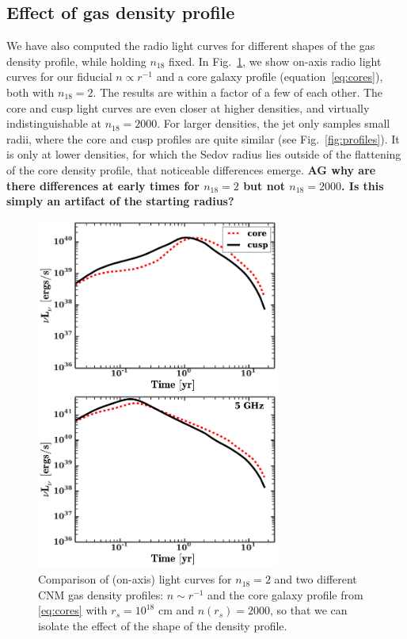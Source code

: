 \documentclass[usenatbib,fleqn]{mnras}
\begin{document}


\subsection{Effect of gas density profile}
\label{sec:profileComp}
We have also computed the radio light curves for different shapes of
the gas density profile, while holding $n_{18}$ fixed. In
Fig.~\ref{fig:cores}, we show on-axis radio light curves for our
fiducial $n\propto r^{-1}$ and a core galaxy profile
(equation~\eqref{eq:cores}), both with $n_{18}=2$.
The results are within a factor of a few of each other. The core and
cusp light curves are even closer at higher densities, and virtually
indistinguishable at $n_{18}=2000$. For larger densities, the jet only
samples small radii, where the core and cusp profiles are quite
similar (see Fig.~\ref{fig:profiles}). It is only at lower densities,
for which the Sedov radius lies outside of the flattening of the core
density profile, that noticeable differences emerge. {\bf AG why are
  there differences at early times for $n_{18}=2$ but not
  $n_{18}=2000$. Is this simply an artifact of the starting radius?}



\begin{figure} 
  \includegraphics[width=8cm]{fig_cores.pdf}
  \caption{\label{fig:cores} Comparison of (on-axis) light curves for
    $n_{18}=2$ and two different CNM gas density profiles: $n\sim
    r^{-1}$ and the core galaxy profile from \eqref{eq:cores} with
    $r_s=10^{18}$ cm and $n(r_s)=2000$, so that we can isolate the
    effect of the shape of the density profile.}
\end{figure}
\end{document}

